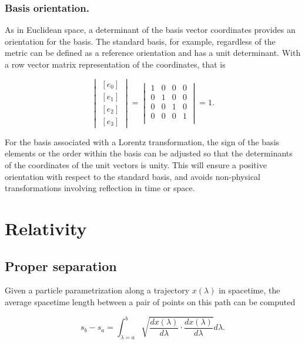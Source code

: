 \subsubsection{Basis orientation.}

As in Euclidean space, a determinant of the basis vector coordinates provides an orientation for the basis.  The standard basis, for example, regardless of the metric can be defined as a reference orientation and has a unit determinant.  With a row vector matrix representation of the coordinates, that is

\begin{equation}\label{eqn:gramSchmidtLorentz:680}
\begin{vmatrix}
[e_0] \\
[e_1] \\
[e_2] \\
[e_3]
\end{vmatrix}
=
\begin{vmatrix}
1 & 0 & 0 & 0 \\
0 & 1 & 0 & 0 \\
0 & 0 & 1 & 0 \\
0 & 0 & 0 & 1 \\
\end{vmatrix}
= 1.
\end{equation}

For the basis associated with a Lorentz transformation, the sign of the basis elements or the order within the basis can be adjusted so that the determinants of the coordinates of the unit vectors is unity.  This will ensure a positive orientation with respect to the standard basis, and avoids non-physical transformations involving reflection in time or space.

\section{Relativity}
\subsection{Proper separation}

Given a particle parametrization along a trajectory $x(\lambda)$ in spacetime, the average spacetime length between a pair of points on this path can be computed

\begin{equation}\label{eqn:gramSchmidtLorentz:400}
s_b - s_a = \int_{\lambda = a}^b \sqrt{ \frac{d x(\lambda)}{d\lambda} \cdot \frac{d x(\lambda)}{d\lambda} } d\lambda.
\end{equation}

